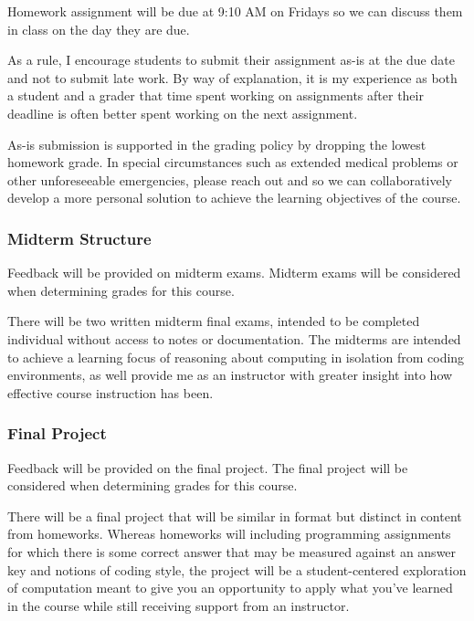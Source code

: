 \documentclass[11pt]{article}
\begin{document}
\bigskip
\noindent Homework assignment will be due at 9:10 AM on Fridays so we can discuss them in class on the 
day they are due.

\bigskip
\noindent As a rule, I encourage students to submit their assignment as-is at the due date and not to
submit late work. By way of explanation, it is my experience as both a student and a grader that time spent working on assignments after their deadline is often better spent working on the next assignment.

\bigskip
\noindent As-is submission is supported in the grading policy by dropping the lowest homework
grade. In special circumstances such as extended medical problems or other unforeseeable
emergencies, please reach out and so we can collaboratively develop a more personal
solution to achieve the learning objectives of the course.

\subsubsection*{Midterm Structure}

Feedback will be provided on midterm exams.  Midterm exams will be considered when determining grades for this course.

\bigskip
\noindent There will be two written midterm final exams, intended to be completed individual
without access to notes or documentation. The midterms are intended to achieve a learning
focus of reasoning about computing in isolation from coding environments,
as well provide me as an instructor with greater insight into how effective course
instruction has been.

\subsubsection*{Final Project}

Feedback will be provided on the final project. The final project will be considered when determining grades for this course.

There will be a final project that will be similar in format but distinct in content from
homeworks. Whereas homeworks will including programming assignments for which there is
some correct answer that may be measured against an answer key and notions of coding
style, the project will be a student-centered exploration of computation meant to
give you an opportunity to apply what you've learned in the course while still receiving
support from an instructor.
\end{document}

